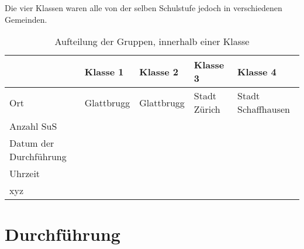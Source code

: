 Die vier Klassen waren alle von der selben Schulstufe jedoch in verschiedenen Gemeinden.


\begin{table}[htbp]
  \centering
  \begin{tabular}{|p{2.3cm}|p{3cm}|p{3cm}|p{3cm}|p{3cm}|}
  \hline & Klasse 1 & Klasse 2 & Klasse 3 & Klasse 4 \\ 
  \hline Ort & Glattbrugg & Glattbrugg & Stadt Zürich & Stadt Schaffhausen \\
  \hline Anzahl SuS & & & & \\
  \hline Datum der Durchführung & & & & \\
  \hline Uhrzeit & & & & \\
  \hline xyz & & & & \\
  \hline
  \end{tabular} 
  \caption{Aufteilung der Gruppen, innerhalb einer Klasse}
  \label{tab:Klassen}
\end{table}





\section{Durchführung}